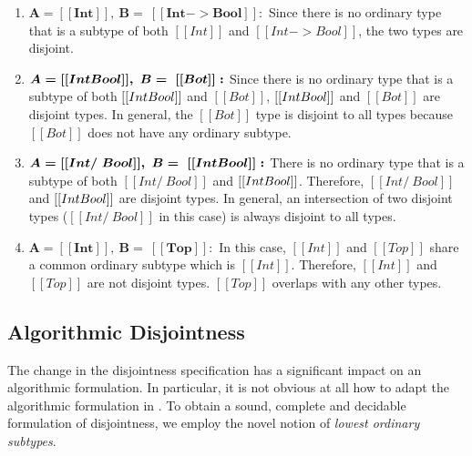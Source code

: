 \begin{enumerate}
  \item $\boldsymbol{A = [[Int]], \ B = \ [[Int -> Bool]]:}$ Since there is no ordinary type that is a subtype of both $[[Int]]$ and $[[Int -> Bool]]$,
        the two types are disjoint.
  \item $\boldsymbol{A = [[Int \/ Bool]], \ B = \ [[Bot]]:}$ Since there is no ordinary type that is a subtype of both $[[Int \/ Bool]]$ and $[[Bot]]$,
    $[[Int \/ Bool]]$ and $[[Bot]]$ are disjoint types.
    In general, the $[[Bot]]$ type is disjoint to all types because $[[Bot]]$ does not
    have any ordinary subtype.
  \item $\boldsymbol{A = [[Int /\ Bool]], \ B = \ [[Int \/ Bool]]:}$ There is no ordinary type that is a subtype of both $[[Int /\ Bool]]$ and $[[Int \/ Bool]]$.
        Therefore, $[[Int /\ Bool]]$ and $[[Int \/ Bool]]$ are disjoint types.
        In general, an intersection of two disjoint types ($[[Int /\ Bool]]$ in this case)
        is always disjoint to all types.
  \item $\boldsymbol{A = [[Int]], \ B = \ [[Top]]:}$ In this case, $[[Int]]$ and $[[Top]]$ share a common ordinary subtype which is $[[Int]]$.
    Therefore, $[[Int]]$ and $[[Top]]$ are not disjoint types.
     $[[Top]]$ overlaps with any other types.
\end{enumerate}


\subsection{Algorithmic Disjointness}

The change in the disjointness specification has a significant impact on an
algorithmic formulation. In particular, it is not obvious at all how to adapt
the algorithmic formulation in . To obtain a
sound, complete and decidable formulation of disjointness, we employ the novel
notion of \emph{lowest ordinary subtypes}.

